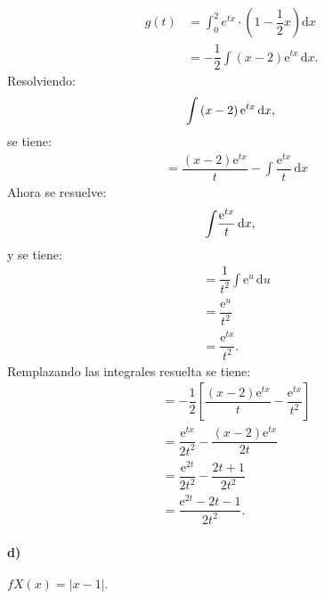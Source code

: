 \documentclass{article}
\begin{document}
\begin{align}
   g(t) &= \displaystyle\int_{0}^2 {e}^{tx}\cdot\left(1-\dfrac{1}{2}x\right){\mathrm{d}x}   \\
        &=  -\dfrac{1}{2}{\displaystyle\int}\left(x-2\right)\mathrm{e}^{tx}\,\mathrm{d}x.
\end{align}
   Resolviendo: 
    \begin{equation*}
        {\displaystyle\int}\left(x-2\right)\mathrm{e}^{tx}\,\mathrm{d}x,\\
    \end{equation*}
    se tiene:
        \begin{align}
         &= \dfrac{\left(x-2\right)\mathrm{e}^{tx}}{t}-{\displaystyle\int}\dfrac{\mathrm{e}^{tx}}{t}\,\mathrm{d}x
         \end{align}
          Ahora se resuelve: 
    \begin{equation*}
       {\displaystyle\int}\dfrac{\mathrm{e}^{tx}}{t}\,\mathrm{d}x,\\
    \end{equation*}  
    y se tiene:
   \begin{align}      
        &=  \dfrac{1}{t^2}{\displaystyle\int}\mathrm{e}^u\,\mathrm{d}u \\
        &=  \dfrac{\mathrm{e}^u}{t^2} \\
        &=   \dfrac{\mathrm{e}^{tx}}{t^2}.
\end{align}
Remplazando las integrales resuelta se tiene:
 \begin{align}
 &=-\dfrac{1}{2}\left[\dfrac{\left(x-2\right)\mathrm{e}^{tx}}{t}-\dfrac{\mathrm{e}^{tx}}{t^2}\right]\\
 &= \dfrac{\mathrm{e}^{tx}}{2t^2}-\dfrac{\left(x-2\right)\mathrm{e}^{tx}}{2t}\\
  &=   \dfrac{\mathrm{e}^{2t}}{2t^2}-\dfrac{2t+1}{2t^2}\\
  &= \dfrac{\mathrm{e}^{2t}-2t-1}{2t^2}.
\end{align}

\paragraph{d)}
$fX(x) = \left|x-1\right|.$
\end{document}
